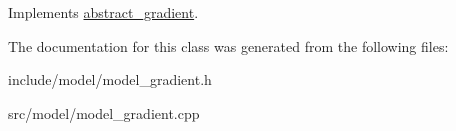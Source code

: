 Implements \hyperlink{classabstract__gradient_a4720548702baebd45572547fd913ef30}{abstract\-\_\-gradient}.



The documentation for this class was generated from the following files\-:\begin{DoxyCompactItemize}
\item 
include/model/model\-\_\-gradient.\-h\item 
src/model/model\-\_\-gradient.\-cpp\end{DoxyCompactItemize}
